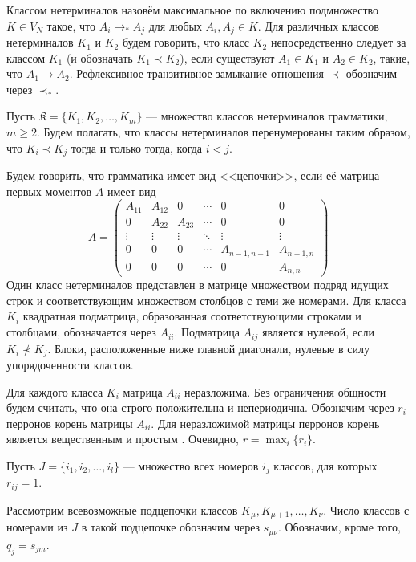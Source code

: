 \documentclass{article}
\begin{document}
Классом нетерминалов назовём максимальное по включению подмножество $K \in V_N$ такое, что $A_i \rightarrow_* A_j$ для любых $A_i, A_j \in K$. Для различных классов нетерминалов $K_1$ и $K_2$ будем говорить, что класс $K_2$ непосредственно следует за классом $K_1$ (и обозначать $K_1 \prec K_2$), если существуют $A_1 \in K_1$ и $A_2 \in K_2$, такие, что $A_1 \rightarrow A_2$. Рефлексивное транзитивное замыкание отношения $\prec$ обозначим через $\prec_*$.

Пусть $\mathfrak{K} = \{ K_1, K_2, \ldots, K_m \}$ --- множество классов нетерминалов грамматики, $m \geqslant 2$. Будем полагать, что классы нетерминалов перенумерованы таким образом, что $K_i \prec K_j$ тогда и только тогда, когда $i < j$.

Будем говорить, что грамматика имеет вид <<цепочки>>, если её матрица первых моментов $A$ имеет вид
\begin{equation}
\label{eq:matrix}
    A = 
    \begin{pmatrix}
        A_{11} & A_{12} & 0 & \cdots & 0 & 0 \\
        0 & A_{22} & A_{23} & \cdots & 0 & 0 \\
        \vdots & \vdots & \vdots & \ddots & \vdots & \vdots \\
        0 & 0 & 0 & \cdots & A_{n-1,n-1} & A_{n-1,n} \\
        0 & 0 & 0 & \cdots & 0 & A_{n,n}
    \end{pmatrix}
\end{equation}
Один класс нетерминалов представлен в матрице множеством подряд идущих строк и соответствующим множеством столбцов с теми же номерами. Для класса $K_i$ квадратная подматрица, образованная соответствующими строками и столбцами, обозначается через $A_{ii}$. Подматрица $A_{ij}$ является нулевой, если $K_i \nprec K_j$. Блоки, расположенные ниже главной диагонали, нулевые в силу упорядоченности классов.

Для каждого класса $K_i$ матрица $A_{ii}$ неразложима. Без ограничения общности будем считать, что она строго положительна и непериодична. Обозначим через $r_i$ перронов корень матрицы $A_{ii}$. Для неразложимой матрицы перронов корень является вещественным и простым \cite{gantmaher}. Очевидно, $r = \max_i \{ r_i \}$.

Пусть $J = \{ i_1, i_2, \ldots, i_l \}$ --- множество всех номеров $i_j$ классов, для которых $r_{ij} = 1$.

Рассмотрим всевозможные подцепочки классов $K_\mu, K_{\mu+1}, \ldots, K_\nu$. Число классов с номерами из $J$ в такой подцепочке обозначим через $s_{\mu \nu}$. Обозначим, кроме того, $q_j = s_{jm}$.
\end{document}
